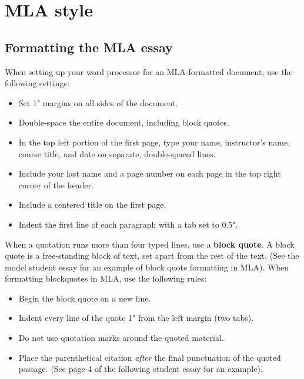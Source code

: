 
\chapter{MLA style} 


\section{Formatting the MLA essay}
When setting up your word processor for an MLA-formatted document, use the 
following settings:

\begin{itemize}
\item Set 1" margins on all sides of the document.
\item Double-space the entire document, including block quotes.
\item In the top left portion of the first page, type your name, instructor's name, 
course title, and date on separate, double-spaced lines.
\item Include your last name and a page number on each page in the top right corner 
of the header.
\item Include a centered title on the first page.
\item Indent the first line of each paragraph with a tab set to 0.5".
\end{itemize}

When a quotation runs more than four typed lines, use a \textbf{block quote}. A block 
quote is a free-standing block of text, set apart from the rest of the text. (See the 
model student essay for an example of block quote formatting in MLA). When formatting 
blockquotes in MLA, use the following rules: 

\begin{itemize}
\item Begin the block quote on a new line. 
\item Indent every line of the quote 1" from the left margin (two tabs). 
\item Do not use quotation marks around the quoted material. 
\item Place the parenthetical citation \emph{after} the final punctuation of the quoted 
passage. (See page 4 of the following student essay for an example).
\end{itemize}

